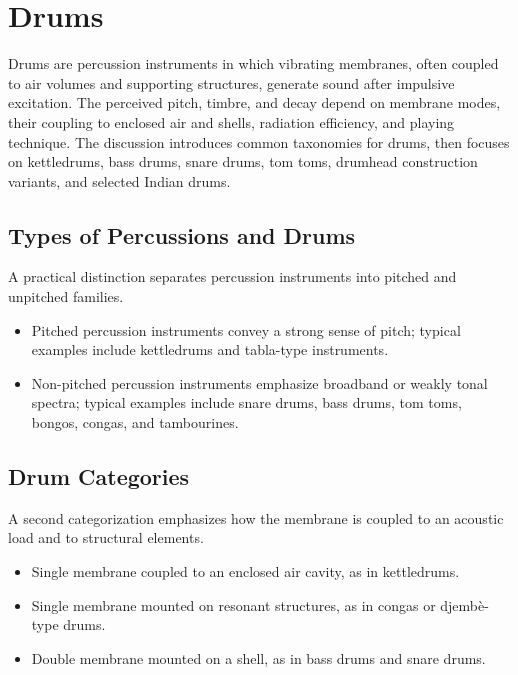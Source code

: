 
\chapter{Drums}

Drums are percussion instruments in which vibrating membranes, often coupled to air volumes and supporting structures, generate sound after impulsive excitation. The perceived pitch, timbre, and decay depend on membrane modes, their coupling to enclosed air and shells, radiation efficiency, and playing technique. The discussion introduces common taxonomies for drums, then focuses on kettledrums, bass drums, snare drums, tom toms, drumhead construction variants, and selected Indian drums.

\section{Types of Percussions and Drums}

A practical distinction separates percussion instruments into pitched and unpitched families.

\begin{itemize}
    \item Pitched percussion instruments convey a strong sense of pitch; typical examples include kettledrums and tabla-type instruments.
    \item Non-pitched percussion instruments emphasize broadband or weakly tonal spectra; typical examples include snare drums, bass drums, tom toms, bongos, congas, and tambourines.
\end{itemize}

\section{Drum Categories}

A second categorization emphasizes how the membrane is coupled to an acoustic load and to structural elements.

\begin{itemize}
    \item Single membrane coupled to an enclosed air cavity, as in kettledrums.
    \item Single membrane mounted on resonant structures, as in congas or djemb\`e-type drums.
    \item Double membrane mounted on a shell, as in bass drums and snare drums.
\end{itemize}

